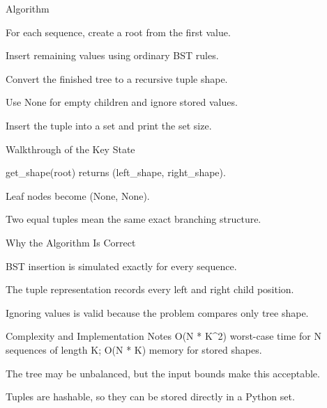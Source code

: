 \documentclass[aspectratio=169,11pt]{beamer}
\begin{document}
\begin{frame}{Algorithm}
\begin{tightitemize}
  \item For each sequence, create a root from the first value.
  \item Insert remaining values using ordinary BST rules.
  \item Convert the finished tree to a recursive tuple shape.
  \item Use None for empty children and ignore stored values.
  \item Insert the tuple into a set and print the set size.
\end{tightitemize}
\end{frame}

\begin{frame}{Walkthrough of the Key State}
\begin{tightitemize}
  \item get\_shape(root) returns (left\_shape, right\_shape).
  \item Leaf nodes become (None, None).
  \item Two equal tuples mean the same exact branching structure.
\end{tightitemize}
\end{frame}

\begin{frame}{Why the Algorithm Is Correct}
\begin{tightitemize}
  \item BST insertion is simulated exactly for every sequence.
  \item The tuple representation records every left and right child position.
  \item Ignoring values is valid because the problem compares only tree shape.
\end{tightitemize}
\end{frame}

\begin{frame}{Complexity and Implementation Notes}
\small
{} O(N * K\textasciicircum{}2) worst-case time for N sequences of length K; O(N * K) memory for stored shapes.

\vspace{0.3cm}
\begin{tightitemize}
  \item The tree may be unbalanced, but the input bounds make this acceptable.
  \item Tuples are hashable, so they can be stored directly in a Python set.
\end{tightitemize}
\end{frame}
\end{document}
